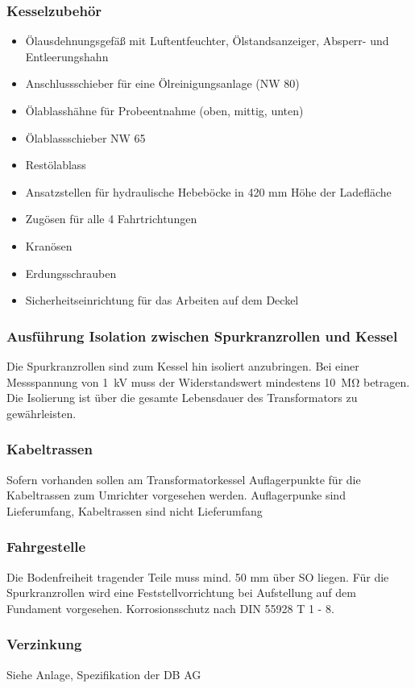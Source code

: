 \subsubsection*{Kesselzubehör}
\begin{itemize}
    \item Ölausdehnungsgefäß mit Luftentfeuchter, Ölstandsanzeiger, Absperr- und Entleerungshahn
    \item Anschlussschieber für eine Ölreinigungsanlage (NW 80)
    \item Ölablasshähne für Probeentnahme (oben, mittig, unten)
    \item Ölablassschieber NW 65
    \item Restölablass
    \item Ansatzstellen für hydraulische Hebeböcke in 420 mm Höhe der Ladefläche
    \item Zugösen für alle 4 Fahrtrichtungen
    \item Kranösen
    \item Erdungsschrauben
    \item Sicherheitseinrichtung für das Arbeiten auf dem Deckel
\end{itemize}
\subsubsection*{Ausführung Isolation zwischen Spurkranzrollen  und Kessel}
Die Spurkranzrollen sind zum Kessel hin isoliert anzubringen.
 Bei einer Messspannung von \SI[]{1}[]{\kV} muss der Widerstandswert mindestens \SI[]{10}[]{\mega\ohm} betragen.
 Die Isolierung ist über die gesamte Lebensdauer des Transformators zu gewährleisten. 
\subsubsection*{Kabeltrassen}
Sofern vorhanden sollen am Transformatorkessel Auflagerpunkte für die Kabeltrassen zum Umrichter vorgesehen werden. Auflagerpunke sind Lieferumfang, Kabeltrassen sind nicht Lieferumfang

\subsubsection*{Fahrgestelle}
Die Bodenfreiheit tragender Teile muss mind. 50 mm über SO liegen. Für die Spurkranzrollen wird eine Feststellvorrichtung bei Aufstellung auf dem Fundament vorgesehen. Korrosionsschutz nach DIN 55928 T 1 - 8.

\subsubsection*{Verzinkung}
Siehe Anlage, Spezifikation der DB AG
